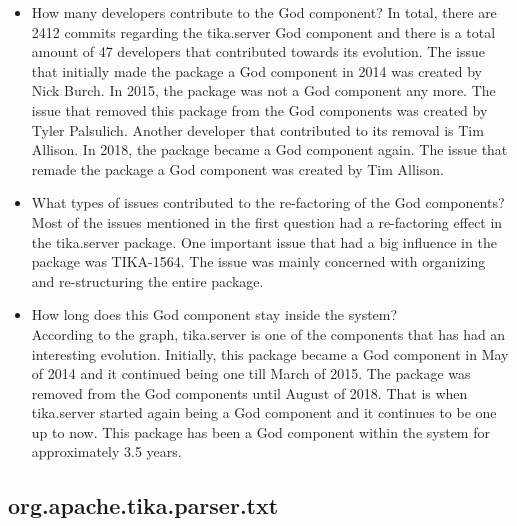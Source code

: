 \documentclass{article}
\begin{document}
\begin{itemize}
    \item How many developers contribute to the God component?
    In total, there are 2412 commits regarding the tika.server God component and there is a total amount of 47 developers that contributed towards its evolution. The issue that initially made the package a God component in 2014 was created by Nick Burch. %
    In 2015, the package was not a God component any more. The issue that removed this package from the God components was created by Tyler Palsulich. Another developer that contributed to its removal is Tim Allison. In 2018, the package became a God component again. The issue that remade the package a God component was created by Tim Allison. %


    \item What types of issues contributed to the re-factoring of the God components?\\
    Most of the issues mentioned in the first question had a re-factoring effect in the tika.server package. One important issue that had a big influence in the package was TIKA-1564. The issue was mainly concerned with organizing and re-structuring the entire package.
    \item  How long does this God component stay inside the system?\\
    According to the graph, tika.server is one of the components that has had an interesting evolution. Initially, this package became a God component in May of 2014 and it continued being one till March of 2015. The package was removed from the God components until August of 2018. That is when tika.server started again being a God component and it continues to be one up to now. This package has been a God component within the system for approximately 3.5 years.
\end{itemize}


\subsection{org.apache.tika.parser.txt}
\end{document}
